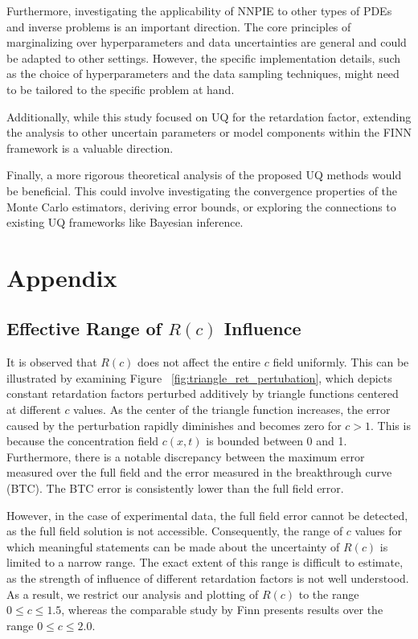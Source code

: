 Furthermore, investigating the applicability of NNPIE to other types of PDEs and inverse problems is an important direction. The core principles of marginalizing over hyperparameters and data uncertainties are general and could be adapted to other settings. However, the specific implementation details, such as the choice of hyperparameters and the data sampling techniques, might need to be tailored to the specific problem at hand.

Additionally, while this study focused on UQ for the retardation factor, extending the analysis to other uncertain parameters or model components within the FINN framework is a valuable direction.

Finally, a more rigorous theoretical analysis of the proposed UQ methods would be beneficial. This could involve investigating the convergence properties of the Monte Carlo estimators, deriving error bounds, or exploring the connections to existing UQ frameworks like Bayesian inference.



\section*{Appendix}


\subsection*{Effective Range of $R(c)$ Influence}
It is observed that $R(c)$ does not affect the entire $c$ field uniformly. This can be illustrated by examining Figure ~\vref{fig:triangle_ret_pertubation}, which depicts constant retardation factors perturbed additively by triangle functions centered at different $c$ values. As the center of the triangle function increases, the error caused by the perturbation rapidly diminishes and becomes zero for $c > 1$. This is because the concentration field $c(x,t)$ is bounded between 0 and 1. Furthermore, there is a notable discrepancy between the maximum error measured over the full field and the error measured in the breakthrough curve (BTC). The BTC error is consistently lower than the full field error.

However, in the case of experimental data, the full field error cannot be detected, as the full field solution is not accessible. Consequently, the range of $c$ values for which meaningful statements can be made about the uncertainty of $R(c)$ is limited to a narrow range. The exact extent of this range is difficult to estimate, as the strength of influence of different retardation factors is not well understood.
As a result, we restrict our analysis and plotting of $R(c)$ to the range $0 \leq c \leq 1.5$, whereas the comparable study by Finn \cite{finn} presents results over the range $0 \leq c \leq 2.0$.



